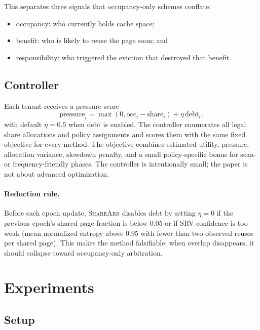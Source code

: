 \documentclass{article}
\newcommand{\sharearb}{\textsc{ShareArb}\xspace}
\newcommand{\srv}{\textsc{SRV}\xspace}
\begin{document}
This separates three signals that occupancy-only schemes conflate:
\begin{itemize}[leftmargin=1.5em]
  \item occupancy: who currently holds cache space;
  \item benefit: who is likely to reuse the page soon; and
  \item responsibility: who triggered the eviction that destroyed that benefit.
\end{itemize}

\subsection{Controller}

Each tenant receives a pressure score
\[
\mathrm{pressure}_i = \max(0, \mathrm{occ}_i - \mathrm{share}_i) + \eta \,\mathrm{debt}_i,
\]
with default $\eta=0.5$ when debt is enabled. The controller enumerates all legal share allocations and policy assignments and scores them with the same fixed objective for every method. The objective combines estimated utility, pressure, allocation variance, slowdown penalty, and a small policy-specific bonus for scan- or frequency-friendly phases. The controller is intentionally small; the paper is not about advanced optimization.

\paragraph{Reduction rule.}
Before each epoch update, \sharearb disables debt by setting $\eta=0$ if the previous epoch's shared-page fraction is below 0.05 or if \srv confidence is too weak (mean normalized entropy above 0.95 with fewer than two observed reuses per shared page). This makes the method falsifiable: when overlap disappears, it should collapse toward occupancy-only arbitration.

\section{Experiments}
\label{sec:experiments}

\subsection{Setup}
\end{document}
